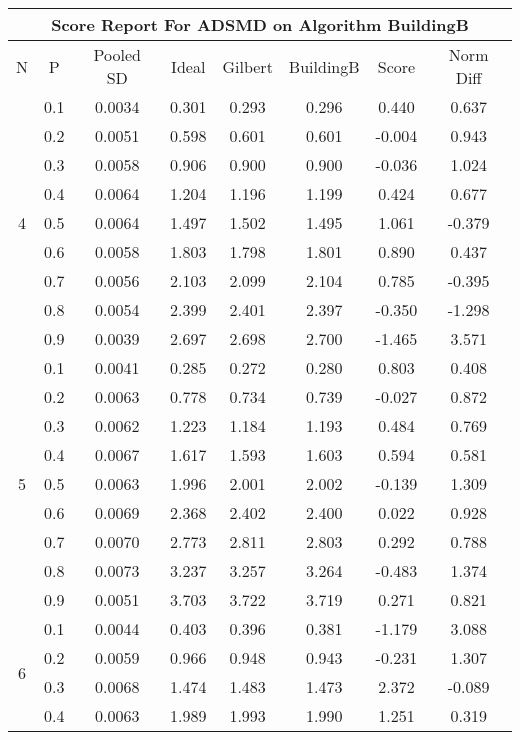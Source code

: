\documentclass[11pt,a4paper]{report}
\begin{document}
\begin{longtable}{ | c | c || c | c | c | c | c | c | }
\hline
\multicolumn{8}{|c|}{ Score Report For ADSMD on Algorithm BuildingB} \\
\hline
N & P & Pooled SD &  Ideal &  Gilbert & BuildingB  & Score & Norm Diff \\
 \hline
 \hline
 \endhead
\multirow{9}{*}{4} & 0.1 & 0.0034 & 0.301 & 0.293 & 0.296 & 0.440 & 0.637 \\
 & 0.2 & 0.0051 & 0.598 & 0.601 & 0.601 & -0.004 & 0.943 \\
 & 0.3 & 0.0058 & 0.906 & 0.900 & 0.900 & -0.036 & 1.024 \\
 & 0.4 & 0.0064 & 1.204 & 1.196 & 1.199 & 0.424 & 0.677 \\
 & 0.5 & 0.0064 & 1.497 & 1.502 & 1.495 & 1.061 & -0.379 \\
 & 0.6 & 0.0058 & 1.803 & 1.798 & 1.801 & 0.890 & 0.437 \\
 & 0.7 & 0.0056 & 2.103 & 2.099 & 2.104 & 0.785 & -0.395 \\
 & 0.8 & 0.0054 & 2.399 & 2.401 & 2.397 & -0.350 & -1.298 \\
 & 0.9 & 0.0039 & 2.697 & 2.698 & 2.700 & -1.465 & 3.571 \\
 \hline
\multirow{9}{*}{5} & 0.1 & 0.0041 & 0.285 & 0.272 & 0.280 & 0.803 & 0.408 \\
 & 0.2 & 0.0063 & 0.778 & 0.734 & 0.739 & -0.027 & 0.872 \\
 & 0.3 & 0.0062 & 1.223 & 1.184 & 1.193 & 0.484 & 0.769 \\
 & 0.4 & 0.0067 & 1.617 & 1.593 & 1.603 & 0.594 & 0.581 \\
 & 0.5 & 0.0063 & 1.996 & 2.001 & 2.002 & -0.139 & 1.309 \\
 & 0.6 & 0.0069 & 2.368 & 2.402 & 2.400 & 0.022 & 0.928 \\
 & 0.7 & 0.0070 & 2.773 & 2.811 & 2.803 & 0.292 & 0.788 \\
 & 0.8 & 0.0073 & 3.237 & 3.257 & 3.264 & -0.483 & 1.374 \\
 & 0.9 & 0.0051 & 3.703 & 3.722 & 3.719 & 0.271 & 0.821 \\
 \hline
\multirow{9}{*}{6} & 0.1 & 0.0044 & 0.403 & 0.396 & 0.381 & -1.179 & 3.088 \\
 & 0.2 & 0.0059 & 0.966 & 0.948 & 0.943 & -0.231 & 1.307 \\
 & 0.3 & 0.0068 & 1.474 & 1.483 & 1.473 & 2.372 & -0.089 \\
 & 0.4 & 0.0063 & 1.989 & 1.993 & 1.990 & 1.251 & 0.319 \\

\end{longtable}
\end{document}
